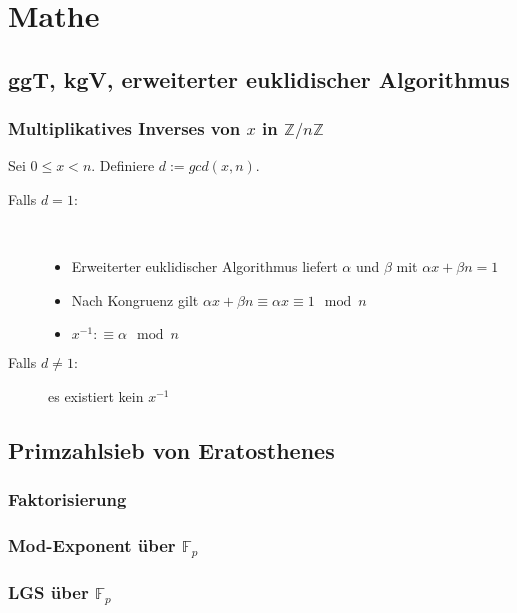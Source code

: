 \section{Mathe}

\subsection{ggT, kgV, erweiterter euklidischer Algorithmus}



\subsubsection{Multiplikatives Inverses von $x$ in $\mathbb{Z}/n\mathbb{Z}$}
Sei $0 \leq x < n$. Definiere $d := gcd(x, n)$.
\begin{description}
	\item[Falls $d = 1$:] ~
	\begin{itemize}[nosep]
		\item Erweiterter euklidischer Algorithmus liefert $\alpha$ und $\beta$ mit $\alpha x + \beta n = 1$
		\item Nach Kongruenz gilt $\alpha x + \beta n \equiv \alpha x \equiv 1 \mod n$
		\item $x^{-1} :\equiv \alpha \mod n$
	\end{itemize}
	\item[Falls $d \neq 1$:] es existiert kein $x^{-1}$
\end{description}


\subsection{Primzahlsieb von Eratosthenes}


\subsubsection{Faktorisierung}


\subsubsection{Mod-Exponent über $\mathbb{F}_p$}


\subsubsection{LGS über $\mathbb{F}_p$}


